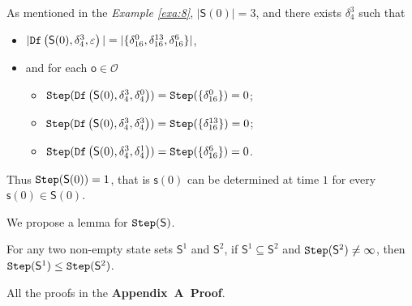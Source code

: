 \begin{example}\label{exa:9}
As mentioned in the {\em Example \ref{exa:8}}, $|\mathsf{S}(0)|=3$, and there exists $\delta_{4}^3$ such that 
 \begin{itemize}
 \item  $|{\tt Df}\left(\mathsf{S}(0),\delta_{4}^3,\varepsilon\right)|=|\{\delta_{16}^0,\delta_{16}^{13},\delta_{16}^6\}|$,
 \item   and for each $\mathsf{o}\in \mathcal{O}$
  \begin{itemize}
  \item   ${\tt Step}({\tt Df}\left(\mathsf{S}(0),\delta_{4}^3,\delta_{4}^0\right))={\tt Step}(\{\delta_{16}^0\})=0$;
 \item  ${\tt Step}({\tt Df}\left(\mathsf{S}(0),\delta_{4}^3,\delta_{4}^3\right))={\tt Step}(\{\delta_{16}^{13}\})=0$;
  \item  ${\tt Step}({\tt Df}\left(\mathsf{S}(0),\delta_{4}^3,\delta_{4}^1\right))={\tt Step}(\{\delta_{16}^{6}\})=0$.
 \end{itemize}
 \end{itemize}
Thus ${\tt Step}(\mathsf{S}(0))=1$, that is $\mathsf{s}(0)$ can be determined at time $1$ for every $\mathsf{s}(0)\in \mathsf{S}(0)$. 
\end{example}  

We propose a lemma for ${\tt Step}(\mathsf{S})$.

\begin{lemma}
For any two non-empty state sets $\mathsf{S}^{1}$ and $\mathsf{S}^{2}$, if $\mathsf{S}^{1}\subseteq\mathsf{S}^{2}$ and ${\tt Step}(\mathsf{S}^{2})\ne\infty$, then ${\tt Step}(\mathsf{S}^{1})\le{\tt Step}(\mathsf{S}^{2})$.%
  \label{lemm:1}
\end{lemma}

All the proofs in the {\bf Appendix~A~Proof}. 

